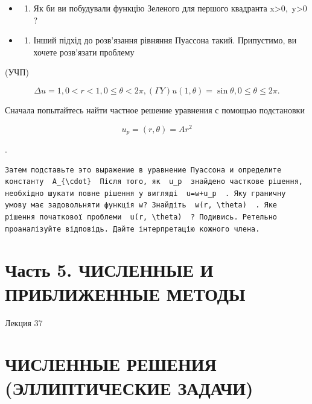 \documentclass[
  ukrainian,
]{article}
\providecommand{\tightlist}{%
  \setlength{\itemsep}{0pt}\setlength{\parskip}{0pt}}
\begin{document}
\begin{itemize}
\tightlist
\item
  \begin{enumerate}
  \def\labelenumi{\arabic{enumi}.}
  \setcounter{enumi}{3}
  \tightlist
  \item
    Як би ви побудували функцію Зеленого для першого квадранта
    x\textgreater0,~y\textgreater0 ?
  \end{enumerate}
\item
  \begin{enumerate}
  \def\labelenumi{\arabic{enumi}.}
  \setcounter{enumi}{4}
  \tightlist
  \item
    Інший підхід до розв'язання рівняння Пуассона такий. Припустимо, ви
    хочете розв'язати проблему
  \end{enumerate}
\end{itemize}

(УЧП)

\[
\Delta u = 1
,  0 < r < 1  ,  0 \le \theta < 2\pi  ,  (\Gamma Y)   u(1, \theta) = \sin \theta  ,  0 \le \theta \le 2\pi  .
\]

Сначала попытайтесь найти частное решение уравнения с помощью
подстановки

\[
u_p = (r, \theta) = Ar^2
\]

.

\begin{verbatim}
Затем подставьте это выражение в уравнение Пуассона и определите константу  A_{\cdot}  Після того, як  u_p  знайдено часткове рішення, необхідно шукати повне рішення у вигляді  u=w+u_p  . Яку граничну умову має задовольняти функція w? Знайдіть  w(r, \theta)  . Яке рішення початкової проблеми  u(r, \theta)  ? Подивись. Ретельно проаналізуйте відповідь. Дайте інтерпретацію кожного члена.
\end{verbatim}

\section{Часть 5. ЧИСЛЕННЫЕ И ПРИБЛИЖЕННЫЕ
МЕТОДЫ}\label{ux447ux430ux441ux442ux44c-5.-ux447ux438ux441ux43bux435ux43dux43dux44bux435-ux438-ux43fux440ux438ux431ux43bux438ux436ux435ux43dux43dux44bux435-ux43cux435ux442ux43eux434ux44b}

Лекция 37

\section{ЧИСЛЕННЫЕ РЕШЕНИЯ (ЭЛЛИПТИЧЕСКИЕ
ЗАДАЧИ)}\label{ux447ux438ux441ux43bux435ux43dux43dux44bux435-ux440ux435ux448ux435ux43dux438ux44f-ux44dux43bux43bux438ux43fux442ux438ux447ux435ux441ux43aux438ux435-ux437ux430ux434ux430ux447ux438}
\end{document}
